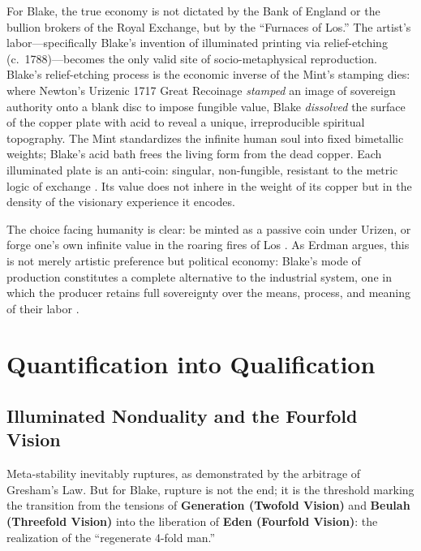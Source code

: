 \documentclass[
]{article}
\begin{document}
For Blake, the true economy is not dictated by the Bank of England or
the bullion brokers of the Royal Exchange, but by the ``Furnaces of
Los.'' The artist's labor---specifically Blake's invention of
illuminated printing via relief-etching (c.~1788)---becomes the only
valid site of socio-metaphysical reproduction. Blake's relief-etching
process is the economic inverse of the Mint's stamping dies: where
Newton's Urizenic 1717 Great Recoinage \emph{stamped} an image of
sovereign authority onto a blank disc to impose fungible value, Blake
\emph{dissolved} the surface of the copper plate with acid to reveal a
unique, irreproducible spiritual topography. The Mint standardizes the
infinite human soul into fixed bimetallic weights; Blake's acid bath
frees the living form from the dead copper. Each illuminated plate is an
anti-coin: singular, non-fungible, resistant to the metric logic of
exchange \citep{poovey2008genres}. Its value does not inhere in the
weight of its copper but in the density of the visionary experience it
encodes.

The choice facing humanity is clear: be minted as a passive coin under
Urizen, or forge one's own infinite value in the roaring fires of Los
\citep{blake1804jerusalem}. As Erdman argues, this is not merely
artistic preference but political economy: Blake's mode of production
constitutes a complete alternative to the industrial system, one in
which the producer retains full sovereignty over the means, process, and
meaning of their labor \citep{erdman1954prophet}.

\newpage

\section{Quantification into
Qualification}\label{quantification-into-qualification}

\subsection{Illuminated Nonduality and the Fourfold
Vision}\label{illuminated-nonduality-and-the-fourfold-vision}

Meta-stability inevitably ruptures, as demonstrated by the arbitrage of
Gresham's Law. But for Blake, rupture is not the end; it is the
threshold marking the transition from the tensions of \textbf{Generation
(Twofold Vision)} and \textbf{Beulah (Threefold Vision)} into the
liberation of \textbf{Eden (Fourfold Vision)}: the realization of the
``regenerate 4-fold man.''
\end{document}
